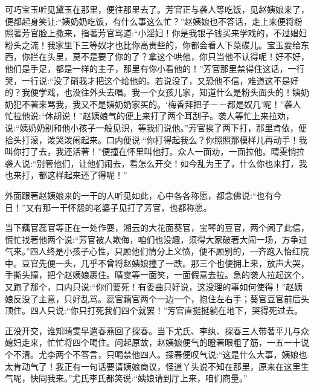 \begin{parag}
    可巧宝玉听见黛玉在那里，便往那里去了。芳官正与袭人等吃饭，见赵姨娘来了，便都起身笑让:“姨奶奶吃饭，有什么事这么忙？”赵姨娘也不答话，走上来便将粉照著芳官脸上撒来，指著芳官骂道:“小淫妇！你是我银子钱买来学戏的，不过娼妇粉头之流！我家里下三等奴才也比你高贵些的，你都会看人下菜碟儿。宝玉要给东西，你拦在头里，莫不是要了你的了？拿这个哄他，你只当他不认得呢！好不好，他们是手足，都是一样的主子，那里有你小看他的！”芳官那里禁得住这话，一行哭，一行说:“没了硝我才把这个给他的。若说没了，又恐他不信，难道这不是好的？我便学戏，也没往外头去唱。我一个女孩儿家，知道什么是粉头面头的！姨奶奶犯不著来骂我，我又不是姨奶奶家买的。‘梅香拜把子－－都是奴几’呢！”袭人忙拉他说:“休胡说！”赵姨娘气的便上来打了两个耳刮子。袭人等忙上来拉劝，说:“姨奶奶别和他小孩子一般见识，等我们说他。”芳官挨了两下打，那里肯依，便拾头打滚，泼哭泼闹起来。口内便说:“你打得起我么？你照照那模样儿再动手！我叫你打了去，我还活著！”便撞在怀里叫他打。众人一面劝，一面拉他。晴雯悄拉袭人说:“别管他们，让他们闹去，看怎么开交！如今乱为王了，什么你也来打，我也来打，都这样起来还了得呢！”
\end{parag}


\begin{parag}
    外面跟著赵姨娘来的一干的人听见如此，心中各各称愿，都念佛说:“也有今日！”又有那一干怀怨的老婆子见打了芳官，也都称愿。
\end{parag}


\begin{parag}
    当下藕官蕊官等正在一处作耍，湘云的大花面葵官，宝琴的豆官，两个闻了此信，慌忙找著他两个说:“芳官被人欺侮，咱们也没趣，须得大家破著大闹一场，方争过气来。”四人终是小孩子心性，只顾他们情分上义愤，便不顾别的，一齐跑入怡红院中。豆官先便一头，几乎不曾将赵姨娘撞了一跌。那三个也便拥上来，放声大哭，手撕头撞，把个赵姨娘裹住。晴雯等一面笑，一面假意去拉。急的袭人拉起这个，又跑了那个，口内只说:“你们要死！有委曲只好说，这没理的事如何使得！”赵姨娘反没了主意，只好乱骂。蕊官藕官两个一边一个，抱住左右手；葵官豆官前后头顶住。四人只说:“你只打死我们四个就罢！”芳官直挺挺躺在地下，哭得死过去。
\end{parag}


\begin{parag}
    正没开交，谁知晴雯早遣春燕回了探春。当下尤氏、李纨、探春三人带著平儿与众媳妇走来，忙忙将四个喝住。问起原故，赵姨娘便气的瞪著眼粗了筋，一五一十说个不清。尤李两个不答言，只喝禁他四人。探春便叹气说:“这是什么大事，姨娘也太肯动气了！我正有一句话要请姨娘商议，怪道丫头说不知在那里，原来在这里生气呢，快同我来。”尤氏李氏都笑说:“姨娘请到厅上来，咱们商量。”
\end{parag}



